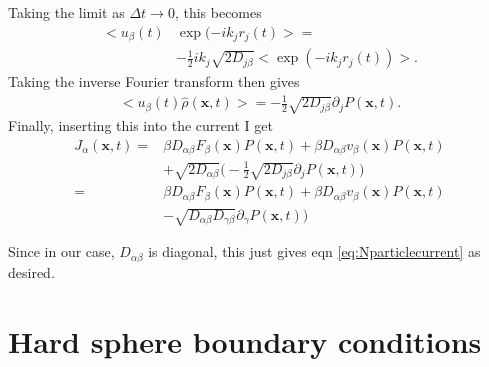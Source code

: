 \documentclass[twocolumn,amsmath,amssymb,aps]{revtex4-1}%
\begin{document}
Taking the limit as $\Delta t\to0$, this becomes
\begin{align}
  <u_{\beta}(t)&\exp(-ik_jr_j(t)>=\nonumber\\
  &-\frac{1}{2}ik_j\sqrt{2D_{j\beta}}\bigg<\exp(-ik_jr_j(t))\bigg>.
\end{align}
Taking the inverse Fourier transform then gives
\begin{align}
  <u_{\beta}(t)\hat{\rho}(\bm{x},t)>=-\frac{1}{2}\sqrt{2D_{j\beta}}
  \partial_jP(\bm{x},t).
\end{align}
Finally, inserting this into the current I get
\begin{align}
  J_{\alpha}(\bm{x},t)=
  &\beta D_{\alpha\beta}F_{\beta}(\bm{x})P(\bm{x},t)
  +\beta D_{\alpha\beta}v_{\beta}(\bm{x})P(\bm{x},t)\nonumber\\
  &+\sqrt{2D_{\alpha\beta}}\bigg(-\frac{1}{2}\sqrt{2D_{j\beta}}
  \partial_jP(\bm{x},t)\bigg)\nonumber\\
  =&\beta D_{\alpha\beta}F_{\beta}(\bm{x})P(\bm{x},t)
  +\beta D_{\alpha\beta}v_{\beta}(\bm{x})P(\bm{x},t)\nonumber\\
  &-\sqrt{D_{\alpha\beta}D_{\gamma\beta}}
  \partial_{\gamma}P(\bm{x},t))
\end{align}

Since in our case, $D_{\alpha\beta}$ is diagonal, this just gives eqn
\ref{eq:Nparticlecurrent} as desired.

\section{Hard sphere boundary conditions \label{app:hardsphereBC}}
\end{document}
